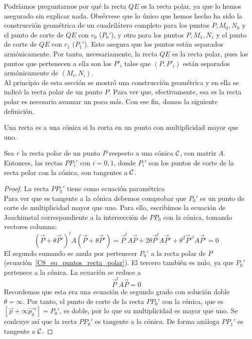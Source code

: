 Podríamos preguntarnos por qué la recta $QE$ es la recta polar, ya que lo hemos asegurado sin explicar nada. Obsérvese que lo único que hemos hecho ha sido la construcción geométrica de un cuadrilátero completo para los puntos $P,M_0,N_0$ y el punto de corte de $QE$ con $r_0$ ($P_0'$), y otro para los puntos $P,M_1,N_1$ y el punto de corte de $QE$ con $r_1$ ($P_1'$). Esto asegura que los puntos están separados armónicamente. Por tanto, necesariamente, la recta $QE$ es la recta polar, pues los puntos que pertenecen a ella son los $P'_i$ tales que $(P,P'_i)$ están separados armónicamente de $(M_i,N_i)$.\\

Al principio de esta sección se mostró una construcción geométrica y en ella se indicó la recta polar de un punto $P$. Para ver que, efectivamente, esa es la recta polar es necesario avanzar un poco más. Con ese fin, damos la siguiente definición.

\begin{defi}
	Una recta es  a una cónica si la corta en un punto con multiplicidad mayor que uno.
\end{defi}
\begin{lem}
	Sea $r$ la recta polar de un punto $P$ respecto a una cónica $\mathcal{C}$, con matriz $A$. Entonces, las rectas $PP_i'$ con $i=0,1$, donde $P_i'$ son los puntos de corte de la recta polar con la cónica, son tangentes a $\mathcal{C}$.
\end{lem}
\begin{proof}
	La recta $PP_0'$ tiene como ecuación paramétrica
	\begin{equation*}
		[\vec{p}+\theta\vec{p_0}']
	\end{equation*}
	Para ver que es tangente a la cónica debemos comprobar que $P_0'$ es un punto de corte de multiplicidad mayor que uno. Para ello, escribimos la ecuación de Joachimstal correspondiente a la intersección de $PP_0$ con la cónica, tomando vectores columna:
	\begin{equation}
	(\vec{P}+\theta \vec{P}')^tA(\vec{P}+\theta \vec{P}')=\vec{P}^tA\vec{P}+2\theta \vec{P}^tA\vec{P}'+\theta^2\vec{P}'^tA\vec{P}'=0
	\end{equation}
	El segundo sumando se anula por pertenecer $P_0'$ a la recta polar de $P$ (ecuación~\eqref{C8_eq_puntos_recta_polar}). El tercero también es nulo, ya que $P_0'$ pertenece a la cónica. La ecuación se reduce a 
	\begin{equation}
	\vec{P}^tA\vec{P}=0
	\end{equation}
	Recordemos que esta era una ecuación de segundo grado con solución doble $\theta=\infty$. Por tanto, el punto de corte de la recta $PP_0'$ con la cónica, que es $[\vec{p}+\infty\vec{p_0}']=P_0'$, es doble, por lo que su multiplicidad es mayor que uno. Se conlcuye así que la recta $PP_0'$ es tangente a la cónica. De forma análoga $PP_1'$ es tangente a $\mathcal{C}$.
\end{proof}

